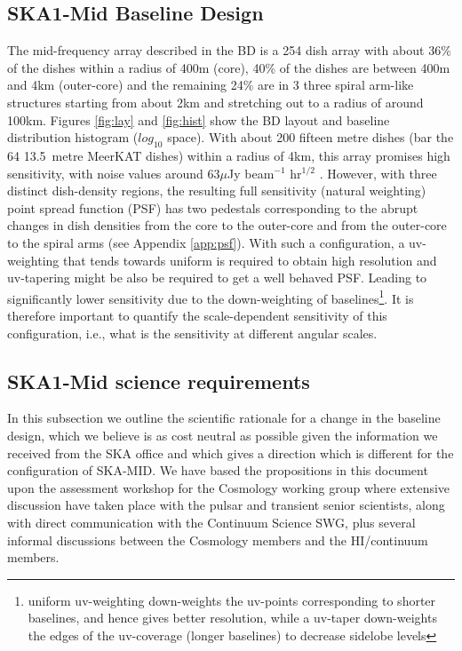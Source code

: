 \documentclass[sfheadings,a4paper,times,9pt,floats,floatfix]{article}
\begin{document}
\subsection{SKA1-Mid Baseline Design}\label{sec:BL}
The mid-frequency array described in the BD is a 254 dish array with about $36\%$ of the dishes within a radius of 400m (core),
40\% of the dishes are between 400m and 4km (outer-core) and the remaining 24\% are in 3 three spiral arm-like structures starting
from about 2km and stretching out to a radius of around 100km. Figures \ref{fig:lay} and \ref{fig:hist} show the BD layout and
baseline distribution histogram ($log_{10}$ space). With about 200 fifteen metre dishes (bar the 64 13.5~metre MeerKAT dishes)
within a radius of 4km, this array promises high sensitivity, with noise values around 63$\mu$Jy beam$^{-1}$ hr$^{1/2}$ \cite{bd}.
However, with three distinct dish-density regions, the resulting full sensitivity (natural weighting) point spread function (PSF)
has two pedestals corresponding to the abrupt changes in dish densities from the core to the outer-core and from the outer-core to
the spiral arms (see Appendix \ref{app:psf}). With such a configuration, a uv-weighting that tends towards uniform is required to
obtain high resolution and uv-tapering might be also be required to get a well behaved PSF. Leading to significantly lower
sensitivity due to the down-weighting of baselines\footnote{uniform uv-weighting down-weights the uv-points corresponding to
shorter baselines, and hence gives better resolution, while a uv-taper down-weights the edges of the uv-coverage (longer
baselines) to decrease sidelobe levels}. It is therefore important to quantify the scale-dependent sensitivity of this
configuration, i.e., what is the sensitivity at different angular scales.
\subsection{SKA1-Mid science requirements}\label{sec:sci-req}

In this subsection we outline the scientific rationale for a change in
the baseline design,
which we believe is as cost neutral as possible given the information we received from the
SKA office and which gives a direction which is different for the configuration of SKA-MID.
We have based the propositions in this document upon the assessment workshop for the
Cosmology working group where extensive discussion have taken place with the pulsar and
transient senior scientists, along with direct communication with the
Continuum Science SWG, plus several informal discussions between the Cosmology
members and the HI/continuum members.
\end{document}
